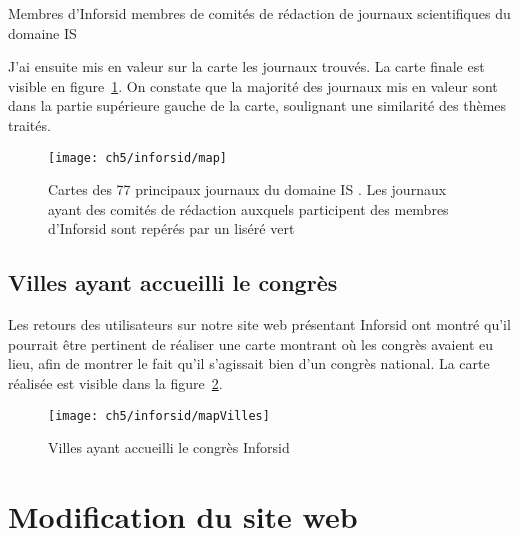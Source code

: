 			\begin{table}[p]
				\centering
				\caption{Membres d'Inforsid membres de comités de rédaction de journaux scientifiques du domaine IS}\label{tab:boards}
				
			\end{table}
			
			J'ai ensuite mis en valeur sur la carte les journaux trouvés. La carte finale est visible en figure~\ref{fig:map}. On constate que la majorité des journaux mis en valeur sont dans la partie supérieure gauche de la carte, soulignant une similarité des thèmes traités.
			
			\begin{figure}[ht]
				\centering
				\texttt{[image: ch5/inforsid/map]}
				\caption{Cartes des 77 principaux journaux du domaine IS \citep{shaping}. Les journaux ayant des comités de rédaction auxquels participent des membres d'Inforsid sont repérés par un liséré vert}\label{fig:map}
			\end{figure}
		
		
		\subsection{Villes ayant accueilli le congrès}
			Les retours des utilisateurs sur notre site web présentant Inforsid ont montré qu'il pourrait être pertinent de réaliser une carte montrant où les congrès avaient eu lieu, afin de montrer le fait qu'il s'agissait bien d'un congrès national. La carte réalisée est visible dans la figure~\ref{fig:mapVilles}.
			
			\begin{figure}[h]
				\centering
				\texttt{[image: ch5/inforsid/mapVilles]}
				\caption{Villes ayant accueilli le congrès Inforsid}\label{fig:mapVilles}
			\end{figure}
	
	\section{Modification du site web}
			
